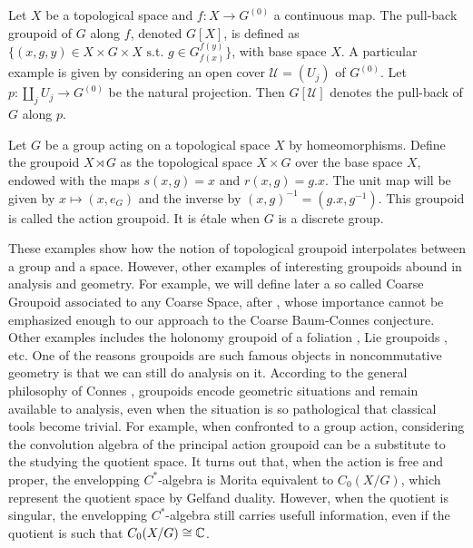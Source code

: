 \begin{Expl}
Let $X$ be a topological space and $f : X\rightarrow G^{(0)} $ a continuous map. The pull-back groupoid of $G$ along $f$, denoted $G[X]$, is defined as $\{(x,g,y)\in X\times G \times X \text{ s.t. }g\in G_{f(x)}^{f(y)}\}$, with base space $X$. A particular example is given by considering an open cover $\mathcal U=(U_j)$ of $G^{(0)}$. Let $p : \coprod_{j} U_j \rightarrow G^{(0)}$ be the natural projection. Then $G[\mathcal U]$ denotes the pull-back of $G$ along $p$.
\end{Expl}

\begin{Expl} Let $G$ be a group acting on a topological space $X$ by homeomorphisms. Define the groupoid $X\rtimes G$ as the topological space $X\times G$ over the base space $X$, endowed with the maps $s(x,g)=x$ and $r(x,g)=g.x$. The unit map will be given by $x\mapsto (x,e_G)$ and the inverse by $(x,g)^{-1} = (g.x , g^{-1})$. This groupoid is called the action groupoid. It is étale when $G$ is a discrete group.  
\end{Expl}

These examples show how the notion of topological groupoid interpolates between a group and a space. However, other examples of interesting groupoids abound in analysis and geometry. For example, we will define later a so called Coarse Groupoid associated to any Coarse Space, after \cite{SkTuYu}, whose importance cannot be emphasized enough to our approach to the Coarse Baum-Connes conjecture.\\

Other examples includes the holonomy groupoid of a foliation \cite{connesfoliations}, Lie groupoids \cite{paterson}, etc. One of the reasons groupoids are such famous objects in noncommutative geometry is that we can still do analysis on it. According to the general philosophy of Connes \cite{Connes94}, groupoids encode geometric situations and remain available to analysis, even when the situation is so pathological that classical tools become trivial. For example, when confronted to a group action, considering the convolution algebra of the principal action groupoid can be a substitute to the studying the quotient space. It turns out that, when the action is free and proper, the envelopping $C^*$-algebra is Morita equivalent to $C_0(X/G)$, which represent the quotient space by Gelfand duality. However, when the quotient is %
singular, the envelopping $C^*$-algebra still carries usefull information, even if the quotient  is such that $C_0(X/G) \cong \mathbb C$.

